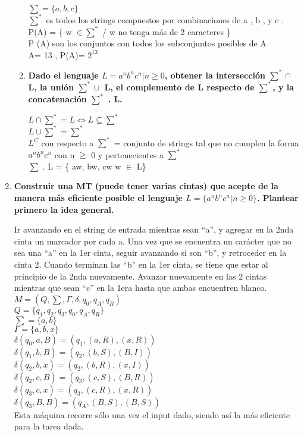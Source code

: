 \documentclass{article}
\begin{document}
\begin{enumerate}
\begin{enumerate}
    $\sum = \{ a, b , c \}$\\
    $\sum^*$ es todos los strings compuestos por combinaciones de a , b , y c .\\
    P(A) = \{ w $\in \sum^*$  / w no tenga más de 2 caracteres \}\\
    P (A) son los conjuntos con todos los subconjuntos posibles de A\\
    \textbar A\textbar = 13 , \textbar P(A)\textbar = $2^13$

\item \textbf{Dado el lenguaje $L = {a^n b^n c^n | n \geq 0}$, obtener la intersección 
$\sum^* \cap$ L, la unión $\sum^* \cup$ L, el complemento de L respecto de $\sum^*$, 
y la concatenación $\sum^*$ . L.}

$L \cap \sum^* = L \Leftrightarrow L \subseteq \sum^*$\\
$L \cup \sum^* = \sum^*$\\
$L^C$ con respecto a $\sum^*$ = conjunto de strings tal que no cumplen la forma $a^n b^n c^n$ con n $\geq$ 0 y
pertenecientes a $\sum^*$\\
$\sum$ . L = \{ aw, bw, cw \textbar w $\in$ L\}
\end{enumerate}

\item \textbf{ Construir una MT (puede tener varias cintas) que acepte de la manera más eficiente
posible el lenguaje $L = \{a^n b^n c^n | n \geq 0\}$. Plantear primero la idea general.}

Ir avanzando en el string de entrada mientras sean “a”, y agregar en la 2nda cinta un marcador
por cada a. Una vez que se encuentra un carácter que no sea una “a” en la 1er cinta, seguir avanzando
si son “b”, y retroceder en la cinta 2. Cuando terminan las “b” en la 1er cinta, se tiene que estar al
principio de la 2nda nuevamente. Avanzar nuevamente en las 2 cintas mientras que sean “c” en la 1era
hasta que ambas encuentren blanco.\\
$M = ( Q,\sum  ,\Gamma , \delta , q_0 , q_A , q_R )$\\
$Q = \{ q_1 , q_2 , q_3 , q_0 , q_A , q_R \}$\\
$\sum = \{ a, b \}$\\
$\Gamma= \{ a, b , x \}$\\
$\delta (q_0 , a , B ) = ( q_1 , ( a, R ), ( x, R ))$\\
$\delta (q_1 , b , B ) = ( q_2 , ( b, S ), ( B, I ))$\\
$\delta (q_2 , b , x ) = ( q_2 , ( b, R ), ( x, I ))$\\
$\delta (q_2 , c , B ) = ( q_3 , ( c, S ), ( B, R ))$\\
$\delta (q_3 , c , x ) = ( q_3 , ( c, R ), ( x, R ))$\\
$\delta (q_3 , B , B ) = ( q_A , ( B, S ), ( B, S ))$\\
Esta máquina recorre sólo una vez el input dado, siendo así la más eficiente para la tarea dada.


\end{enumerate}
\end{document}
